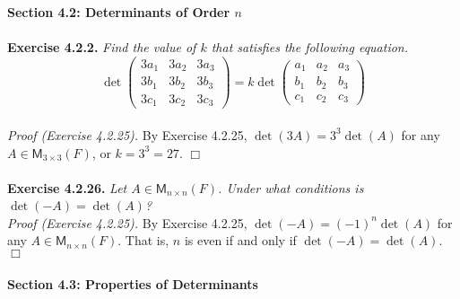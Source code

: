 \documentclass{article}
\begin{document}






\textbf{\large Section 4.2: Determinants of Order $n$} \\\\



\textbf{Exercise 4.2.2.}
\emph{Find the value of $k$ that satisfies the following equation.
$$\det
  \begin{pmatrix}
    3a_1 & 3a_2 & 3a_3 \\
    3b_1 & 3b_2 & 3b_3 \\
    3c_1 & 3c_2 & 3c_3
  \end{pmatrix}
= k\det
  \begin{pmatrix}
    a_1 & a_2 & a_3 \\
    b_1 & b_2 & b_3 \\
    c_1 & c_2 & c_3
  \end{pmatrix}$$} \\

\emph{Proof (Exercise 4.2.25).}
By Exercise 4.2.25,
$\det(3A) = 3^3 \det(A)$ for any $A \in \mathsf{M}_{3 \times 3}(F)$,
or $k = 3^3 = 27$.
$\Box$ \\\\






\textbf{Exercise 4.2.26.}
\emph{Let $A \in \mathsf{M}_{n \times n}(F)$.
Under what conditions is $\det(-A) = \det(A)$?} \\

\emph{Proof (Exercise 4.2.25).}
By Exercise 4.2.25,
$\det(-A) = (-1)^n \det(A)$ for any $A \in \mathsf{M}_{n \times n}(F)$.
That is, $n$ is even if and only if $\det(-A) = \det(A)$.
$\Box$ \\\\






\textbf{\large Section 4.3: Properties of Determinants} \\\\
\end{document}
